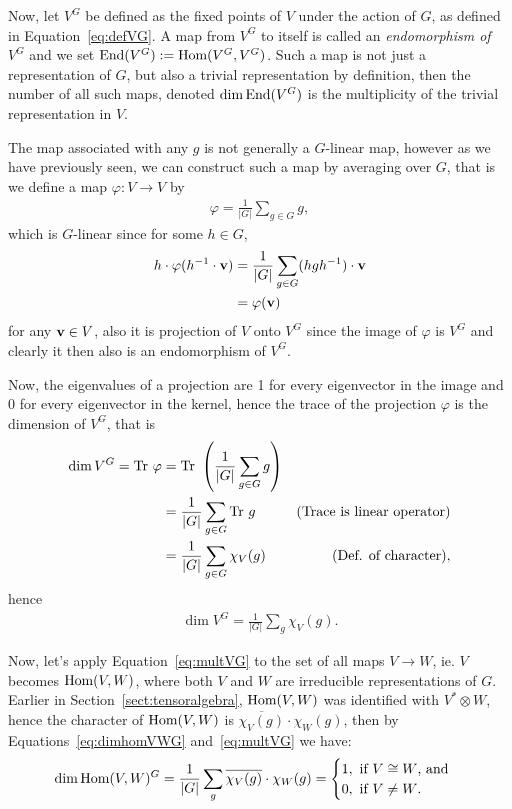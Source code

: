 Now, let $V^G$ be defined as the fixed points of $V$ under the action of $G$, as defined in Equation~\ref{eq:defVG}. A map from $V^G$ to itself is called an \textit{endomorphism of $V^G$} and we set $\text{End}(V^G) := \text{Hom}(V^G, V^G)$. Such a map is not just a representation of $G$, but also a trivial representation by definition, then the number of all such maps, denoted $\dim \text{End}(V^G)$ is the multiplicity of the trivial representation in $V$. 

The map associated with any $g$ is not generally a $G$-linear map, however as we have previously seen, we can construct such a map by averaging over $G$, that is we define a map $\varphi: V \rightarrow V$ by
\begin{align*}
	\varphi = \frac{1}{|G|} \sum_{g \in G} g,
\end{align*}
which is $G$-linear since for some $h \in G$, \begin{align*}
	h \cdot \varphi(h^{-1} \cdot \mathbf{v}) &= \frac{1}{|G|} \sum_{g \in G} (hgh^{-1}) \cdot \mathbf{v} \\
	&= \varphi(\mathbf{v})
\end{align*} for any $\mathbf{v} \in V$, also it is projection of $V$ onto $V^G$ since the image of $\varphi$ is $V^G$ and clearly it then also is an endomorphism of $V^G$. 

Now, the eigenvalues of a projection are 1 for every eigenvector in the image and 0 for every eigenvector in the kernel, hence the trace of the projection $\varphi$ is the dimension of $V^G$, that is
\begin{align*}
	\dim V^G = \text{Tr } \varphi &= \text{Tr } \left( \frac{1}{|G|} \sum_{g \in G} g \right) \\
	&= \frac{1}{|G|} \sum_{g \in G} \text{Tr } g & \text{(Trace is linear operator)} \\
	&= \frac{1}{|G|} \sum_{g \in G} \chi_{V}(g) & \text{(Def. of character)},
\end{align*}
hence \begin{align}\label{eq:multVG}
	\dim V^G = \frac{1}{|G|} \sum_g \chi_V(g).
\end{align}

Now, let's apply Equation~\ref{eq:multVG} to the set of all maps $V \rightarrow W$, ie. $V$ becomes $\text{Hom} (V,W)$, where both $V$ and $W$ are irreducible representations of $G$. Earlier in Section~\ref{sect:tensoralgebra}, $\text{Hom}(V,W)$ was identified with $V^* \otimes W$, hence the character of $\text{Hom}(V,W)$ is $\overline{\chi_V(g)}\cdot\chi_W(g)$, then by Equations~\ref{eq:dimhomVWG} and~\ref{eq:multVG} we have:
\begin{align*}
	\dim \text{Hom}(V,W)^G = \frac{1}{|G|} \sum_g \overline{\chi_V(g)}\cdot\chi_W(g) = \begin{cases}
		1, \text{ if $V \cong W$, and} \\
		0, \text{ if $V \neq W$.}
	\end{cases}
\end{align*}

